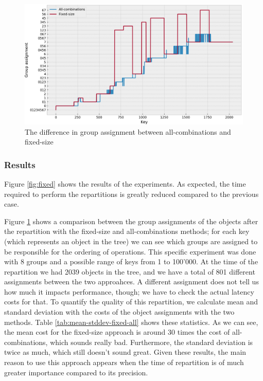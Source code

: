\begin{figure}[!htb]
  \centering
  \includegraphics[width=\textwidth,height=\textheight,keepaspectratio]{img/partition_difference_fixed_all.png}
  \caption{The difference in group assignment between all-combinations and fixed-size}
  \label{fig:fixed-partitioning}
\end{figure}

\subsubsection{Results}
Figure \ref{fig:fixed} shows the results of the experiments. As expected, the time required to perform the repartitions is greatly reduced compared to the previous case. 

Figure \ref{fig:fixed-partitioning} shows a comparison between the group assignments of the objects after the repartition with the fixed-size and all-combinations methods; for each key (which represents an object in the tree) we can see which groups are assigned to be responsible for the ordering of operations. This specific experiment was done with 8 groups and a possible range of keys from 1 to 100'000. At the time of the repartition we had 2039 objects in the tree, and we have a total of 801 different assignments between the two approahces. A different assignment does not tell us how much it impacts performance, though; we have to check the actual latency costs for that.
To quantify the quality of this repartition, we calculate mean and standard deviation with the costs of the object assignments with the two methods. Table \ref{tab:mean-stddev-fixed-all} shows these statistics. As we can see, the mean cost for the fixed-size approach is around 30 times the cost of all-combinations, which sounds really bad. Furthermore, the standard deviation is twice as much, which still doesn't sound great. Given these results, the main reason to use this approach appears when the time of repartition is of much greater importance compared to its precision.

